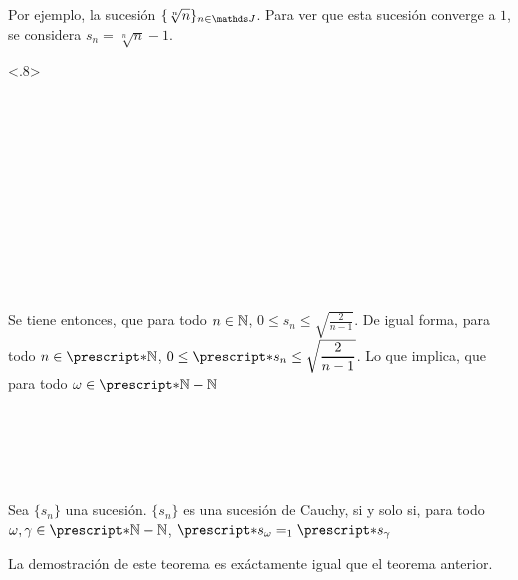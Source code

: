 Por ejemplo, la sucesión $\{\sqrt[n]{n}\}_{n\in\J}$. Para ver que esta sucesión
converge a $1$, se considera $s_n = \sqrt[n]{n} - 1$.
\begin{longderivation}<.8>
    \\
  \equiv\\
    \\
  \equiv\\
    \\
  \To\\
    \\
  \equiv\\
    \\
  \equiv\\
    \\
  \equiv\\
\end{longderivation}

Se tiene entonces, que para todo $n\in\mathbb{N}$, $0\leq s_n \leq \sqrt{\frac{2}{n-1}}$.
De igual forma, para todo $n\in\st{\N}$, $0\leq \st{s_n} \leq \sqrt{\frac{2}{n-1}}$.
Lo que implica, que para todo $\omega\in\st{\N}-\N$
\begin{longderivation}
    \\
  \\
    \\
  \equiv\\
\end{longderivation}

\begin{theorem}
  Sea $\{s_n\}$ una sucesión. $\{s_n\}$ es una sucesión de Cauchy, si y
  solo si, para todo $\omega,\gamma\in\st{\N}-\N$, $\st{s_\omega =_1 \st{s_\gamma}}$
\end{theorem}

La demostración de este teorema es exáctamente igual que el teorema
anterior.

